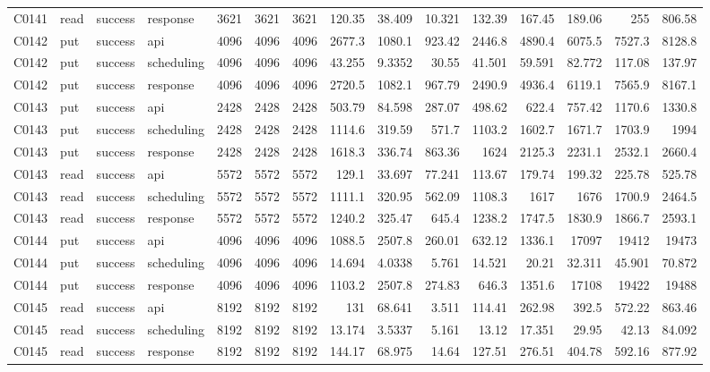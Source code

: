 \begin{landscape}
\begin{longtable}{llllrrrrrrrrrrr}
C0141 & read & success & response & 3621 & 3621 & 3621 & 120.35 & 38.409 & 10.321 & 132.39 & 167.45 & 189.06 & 255 & 806.58\\
C0142 & put & success & api & 4096 & 4096 & 4096 & 2677.3 & 1080.1 & 923.42 & 2446.8 & 4890.4 & 6075.5 & 7527.3 & 8128.8\\
C0142 & put & success & scheduling & 4096 & 4096 & 4096 & 43.255 & 9.3352 & 30.55 & 41.501 & 59.591 & 82.772 & 117.08 & 137.97\\
C0142 & put & success & response & 4096 & 4096 & 4096 & 2720.5 & 1082.1 & 967.79 & 2490.9 & 4936.4 & 6119.1 & 7565.9 & 8167.1\\
C0143 & put & success & api & 2428 & 2428 & 2428 & 503.79 & 84.598 & 287.07 & 498.62 & 622.4 & 757.42 & 1170.6 & 1330.8\\
C0143 & put & success & scheduling & 2428 & 2428 & 2428 & 1114.6 & 319.59 & 571.7 & 1103.2 & 1602.7 & 1671.7 & 1703.9 & 1994\\
C0143 & put & success & response & 2428 & 2428 & 2428 & 1618.3 & 336.74 & 863.36 & 1624 & 2125.3 & 2231.1 & 2532.1 & 2660.4\\
C0143 & read & success & api & 5572 & 5572 & 5572 & 129.1 & 33.697 & 77.241 & 113.67 & 179.74 & 199.32 & 225.78 & 525.78\\
C0143 & read & success & scheduling & 5572 & 5572 & 5572 & 1111.1 & 320.95 & 562.09 & 1108.3 & 1617 & 1676 & 1700.9 & 2464.5\\
C0143 & read & success & response & 5572 & 5572 & 5572 & 1240.2 & 325.47 & 645.4 & 1238.2 & 1747.5 & 1830.9 & 1866.7 & 2593.1\\
C0144 & put & success & api & 4096 & 4096 & 4096 & 1088.5 & 2507.8 & 260.01 & 632.12 & 1336.1 & 17097 & 19412 & 19473\\
C0144 & put & success & scheduling & 4096 & 4096 & 4096 & 14.694 & 4.0338 & 5.761 & 14.521 & 20.21 & 32.311 & 45.901 & 70.872\\
C0144 & put & success & response & 4096 & 4096 & 4096 & 1103.2 & 2507.8 & 274.83 & 646.3 & 1351.6 & 17108 & 19422 & 19488\\
C0145 & read & success & api & 8192 & 8192 & 8192 & 131 & 68.641 & 3.511 & 114.41 & 262.98 & 392.5 & 572.22 & 863.46\\
C0145 & read & success & scheduling & 8192 & 8192 & 8192 & 13.174 & 3.5337 & 5.161 & 13.12 & 17.351 & 29.95 & 42.13 & 84.092\\
C0145 & read & success & response & 8192 & 8192 & 8192 & 144.17 & 68.975 & 14.64 & 127.51 & 276.51 & 404.78 & 592.16 & 877.92\\

\end{longtable}
\end{landscape}
